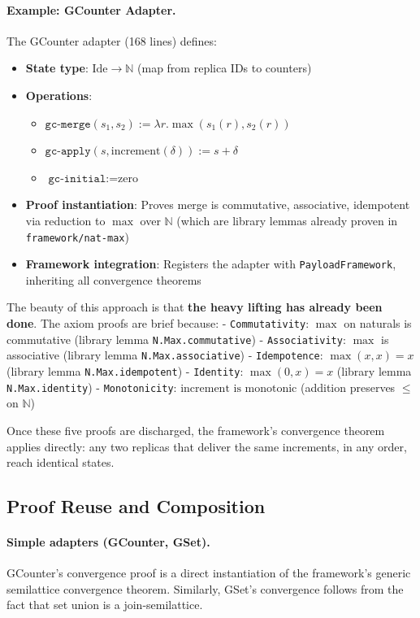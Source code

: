 \paragraph{Example: GCounter Adapter.}
The GCounter adapter (168 lines) defines:
\begin{itemize}
  \item \textbf{State type}: $\text{Ide} \to \mathbb{N}$ (map from replica IDs to counters)
  \item \textbf{Operations}: 
    \begin{itemize}
      \item $\texttt{gc-merge}(s_1, s_2) := \lambda r. \max(s_1(r), s_2(r))$
      \item $\texttt{gc-apply}(s, \text{increment}(\delta)) := s + \delta$
      \item $\texttt{gc-initial} := \text{zero}$
    \end{itemize}
  \item \textbf{Proof instantiation}: Proves merge is commutative, associative, idempotent via reduction to $\max$ over $\mathbb{N}$ (which are library lemmas already proven in \texttt{framework/nat-max})
  \item \textbf{Framework integration}: Registers the adapter with \texttt{PayloadFramework}, inheriting all convergence theorems
\end{itemize}

The beauty of this approach is that \textbf{the heavy lifting has already been done}. The axiom proofs are brief because:
- \texttt{Commutativity}: $\max$ on naturals is commutative (library lemma \texttt{N.Max.commutative})
- \texttt{Associativity}: $\max$ is associative (library lemma \texttt{N.Max.associative})
- \texttt{Idempotence}: $\max(x, x) = x$ (library lemma \texttt{N.Max.idempotent})
- \texttt{Identity}: $\max(0, x) = x$ (library lemma \texttt{N.Max.identity})
- \texttt{Monotonicity}: $\text{increment is monotonic}$ (addition preserves $\leq$ on $\mathbb{N}$)

Once these five proofs are discharged, the framework's convergence theorem applies directly: any two replicas that deliver the same increments, in any order, reach identical states.

\subsection{Proof Reuse and Composition}

\paragraph{Simple adapters (GCounter, GSet).}
GCounter's convergence proof is a direct instantiation of the framework's generic semilattice convergence theorem. Similarly, GSet's convergence follows from the fact that set union is a join-semilattice.

